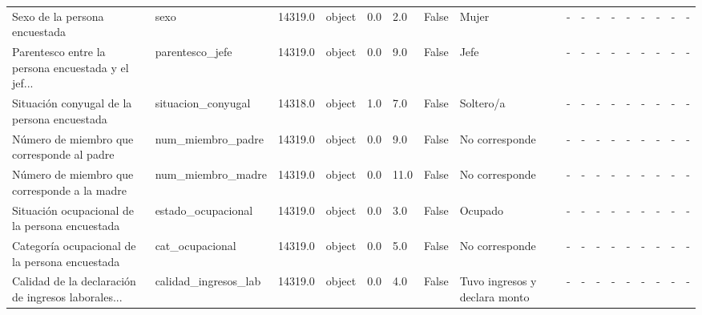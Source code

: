 \documentclass[a4paper]{article}
\begin{document}
\begin{landscape}
{\begin{tabular}{lllllllllllllllll}
        Sexo de la persona encuestada                      &                         sexo &  14319.0 &   object &     0.0 &     2.0 &   False &                          Mujer &             - &             - &    - &        - &        - &        - &          - &          - &           - \\
        Parentesco entre la persona encuestada y el jef... &              parentesco\_jefe &  14319.0 &   object &     0.0 &     9.0 &   False &                           Jefe &             - &             - &    - &        - &        - &        - &          - &          - &           - \\
        Situación conyugal de la persona encuestada        &           situacion\_conyugal &  14318.0 &   object &     1.0 &     7.0 &   False &                      Soltero/a &             - &             - &    - &        - &        - &        - &          - &          - &           - \\
        Número de miembro que corresponde al padre         &            num\_miembro\_padre &  14319.0 &   object &     0.0 &     9.0 &   False &                 No corresponde &             - &             - &    - &        - &        - &        - &          - &          - &           - \\
        Número de miembro que corresponde a la madre       &            num\_miembro\_madre &  14319.0 &   object &     0.0 &    11.0 &   False &                 No corresponde &             - &             - &    - &        - &        - &        - &          - &          - &           - \\
        Situación ocupacional de la persona encuestada     &           estado\_ocupacional &  14319.0 &   object &     0.0 &     3.0 &   False &                        Ocupado &             - &             - &    - &        - &        - &        - &          - &          - &           - \\
        Categoría ocupacional de la persona encuestada     &              cat\_ocupacional &  14319.0 &   object &     0.0 &     5.0 &   False &                 No corresponde &             - &             - &    - &        - &        - &        - &          - &          - &           - \\
        Calidad de la declaración de ingresos laborales... &         calidad\_ingresos\_lab &  14319.0 &   object &     0.0 &     4.0 &   False &  Tuvo ingresos y declara monto &             - &             - &    - &        - &        - &        - &          - &          - &           - \\

\end{tabular}}
\end{landscape}
\end{document}
